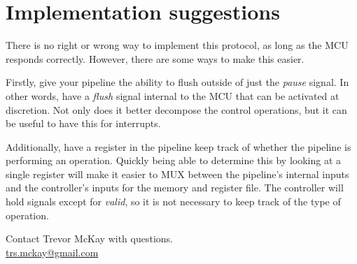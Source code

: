 \documentclass[10pt,a4paper]{article}
\begin{document}
\section{Implementation suggestions}
There is no right or wrong way to implement this protocol, as long as the MCU responds correctly.
However, there are some ways to make this easier.

Firstly, give your pipeline the ability to flush
outside of just the \emph{pause} signal. In other words, have a \emph{flush} signal internal to the
MCU that can be activated at discretion. Not only does it better decompose the control operations,
but it can be useful to have this for interrupts.

Additionally, have a register in the pipeline keep track of whether the pipeline is performing an
operation. Quickly being able to determine this by looking at a single register
will make it easier to MUX between the pipeline's internal inputs and the controller's inputs for
the memory and register file. The controller will hold signals except for \emph{valid}, so it is not
necessary to keep track of the type of operation.

\vspace*{\fill}
\begin{center}
    \noindent Contact Trevor McKay with questions.\\
    \href{mailto:trs.mckay@gmail.com}{trs.mckay@gmail.com}
\end{center}
\end{document}
